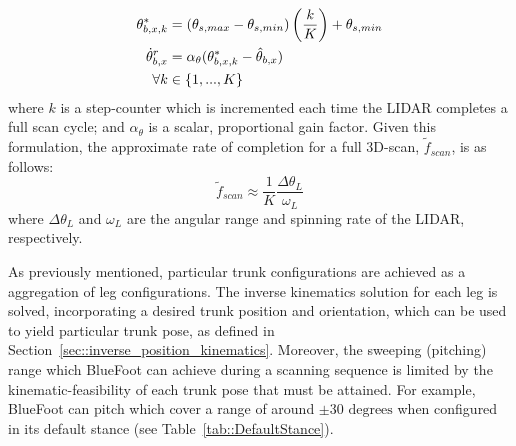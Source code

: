 				\begin{equation}
					\begin{split}
					\theta_{b,x,k}^{*} &= 
						\left(\theta_{s,max}-\theta_{s,min}\right)
							\left(\frac{k}{K}\right) + 
								\theta_{s,min} \\
					\dot{\theta}_{b,x}^{r} &=
						\alpha_{\theta}
							(\theta_{b,x,k}^{*} - \hat{\theta}_{b,x} ) \\
							\forall k &\in \{1,...,K\}
					\end{split}
				\end{equation}
			where $k$ is a step-counter which is incremented each time the LIDAR completes a full scan cycle; and $\alpha_{\theta}$ is a scalar, proportional gain factor. Given this formulation, the approximate rate of completion for a full 3D-scan, $\tilde{f}_{scan}$, is as follows:
				\begin{equation}
					\tilde{f}_{scan}\approx\frac{1}{K}\frac{\Delta\theta_{L}}{\omega_{L}}
					\label{eq::point_cloud_collection_rate}
				\end{equation}
			where $\Delta\theta_{L}$ and $\omega_{L}$ are the angular range and spinning rate of the LIDAR, respectively.

			As previously mentioned, particular trunk configurations are achieved as a aggregation of leg configurations. The inverse kinematics solution for each leg is solved, incorporating a desired trunk position and orientation, which can be used to yield particular trunk pose, as defined in Section~\ref{sec::inverse_position_kinematics}. Moreover, the sweeping (pitching) range which BlueFoot can achieve during a scanning sequence is limited by the kinematic-feasibility of each trunk \Kth pose that must be attained. For example, BlueFoot can pitch which cover a range of around $\pm 30\text{ degrees}$ when configured in its default stance (see Table~\ref{tab::DefaultStance}).


